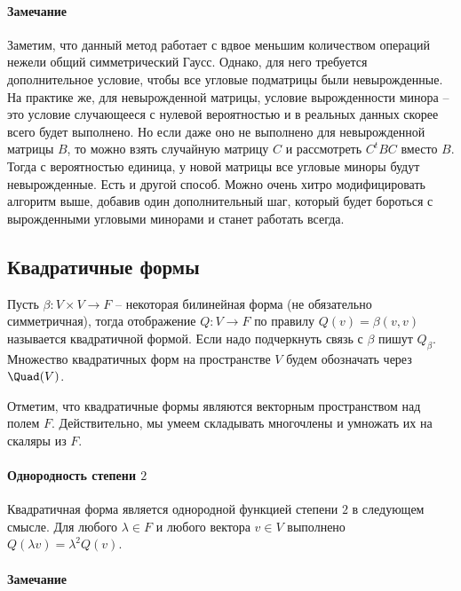 \paragraph{Замечание}

Заметим, что данный метод работает с вдвое меньшим количеством операций нежели общий симметрический Гаусс.
Однако, для него требуется дополнительное условие, чтобы все  угловые подматрицы были невырожденные.
На практике же, для невырожденной матрицы, условие вырожденности минора -- это условие случающееся с нулевой вероятностью и в реальных данных скорее всего будет выполнено.
Но если даже оно не выполнено для невырожденной матрицы $B$, то можно взять случайную матрицу $C$ и рассмотреть $C^tBC$ вместо $B$.
Тогда с вероятностью единица, у новой матрицы все угловые миноры будут невырожденные.
Есть и другой способ.
Можно очень хитро модифицировать алгоритм выше, добавив один дополнительный шаг, который будет бороться с вырожденными угловыми минорами и станет работать всегда.


\subsection{Квадратичные формы}


\begin{definition}
Пусть $\beta\colon V\times V\to F$ -- некоторая билинейная форма (не обязательно симметричная), тогда отображение $Q\colon V\to F$ по правилу $Q(v) = \beta(v, v)$ называется квадратичной формой.
Если надо подчеркнуть связь с $\beta$ пишут $Q_\beta$.
 Множество квадратичных форм на пространстве $V$ будем обозначать через $\Quad(V)$.
\end{definition}

Отметим, что квадратичные формы являются векторным пространством над полем $F$.
Действительно, мы умеем складывать многочлены и умножать их на скаляры из $F$.

\paragraph{Однородность степени $2$}

Квадратичная форма является однородной функцией степени $2$ в следующем смысле.
Для любого $\lambda\in F$ и любого вектора $v\in V$ выполнено $Q(\lambda v) = \lambda^2 Q(v)$.


\paragraph{Замечание}


